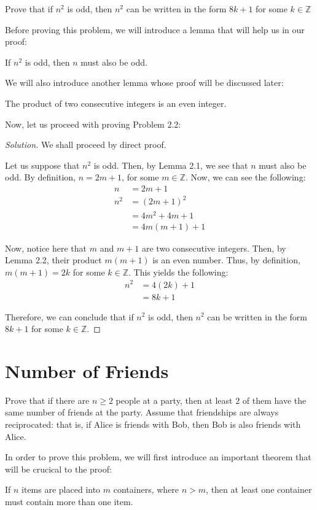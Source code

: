 \documentclass[openany]{book}
\newenvironment{solution}{\begin{proof}[Solution]}{\end{proof}}
\newcommand{\ZZ}{\mathbb{Z}}
\begin{document}
\begin{hw}
	Prove that if $n^2$ is odd, then $n^2$ can be written in the form $8k+1$ for some $k\in\ZZ$
\end{hw}

Before proving this problem, we will introduce a lemma that will help us in our proof:
\begin{lem}[Problem 2.1]
	If $n^2$ is odd, then $n$ must also be odd.
\end{lem}

We will also introduce another lemma whose proof will be discussed later:
\begin{lem}
	The product of two consecutive integers is an even integer.
\end{lem}

Now, let us proceed with proving Problem 2.2:
\begin{solution}
	We shall proceed by direct proof.
	
	Let us suppose that $n^2$ is odd. Then, by Lemma 2.1, we see that $n$ must also be odd. By definition, $n=2m+1$, for some $m\in\ZZ$. Now, we can see the following:
	\begin{align*}
		n &= 2m+1 \\
		n^2 &= (2m+1)^2 \\
		&= 4m^2 + 4m + 1 \\
		&= 4m(m+1)+1
	\end{align*}
	
	Now, notice here that $m$ and $m+1$ are two consecutive integers. Then, by Lemma 2.2, their product $m(m+1)$ is an even number. Thus, by definition, $m(m+1)=2k$ for some $k\in\ZZ$. This yields the following:
	\begin{align*}
		n^2 &= 4(2k)+1 \\
		&= 8k + 1
	\end{align*}
	
	Therefore, we can conclude that if $n^2$ is odd, then $n^2$ can be written in the form $8k+1$ for some $k\in\ZZ$.
\end{solution}

\section{Number of Friends}
\begin{hw}
	Prove that if there are $n \geq 2$ people at a party, then at least $2$ of them have the same number of friends at the party. Assume that friendships are always reciprocated: that is, if Alice is friends with Bob, then Bob is also friends with Alice.
\end{hw}
In order to prove this problem, we will first introduce an important theorem that will be crucical to the proof:
\begin{thm}
	If $n$ items are placed into $m$ containers, where $n > m$, then at least one container must contain more than one item.
\end{thm}
\end{document}
